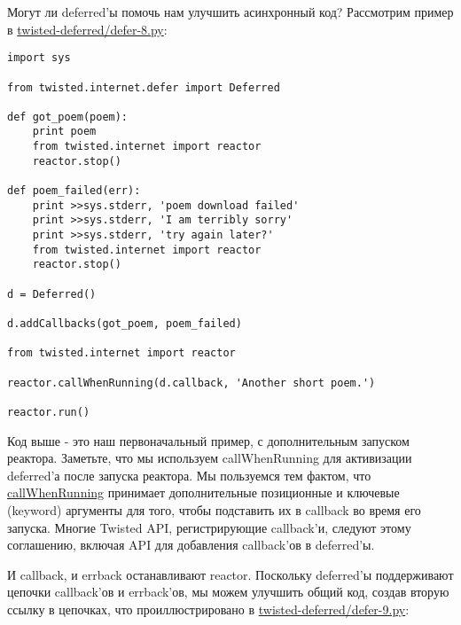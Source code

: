 Могут ли deferred'ы помочь нам улучшить асинхронный код? 
Рассмотрим пример в 
\href{http://github.com/jdavisp3/twisted-intro/blob/master/twisted-deferred/defer-8.py}{twisted-deferred/defer-8.py}:

 \begin{verbatim}
import sys

from twisted.internet.defer import Deferred

def got_poem(poem):
    print poem
    from twisted.internet import reactor
    reactor.stop()

def poem_failed(err):
    print >>sys.stderr, 'poem download failed'
    print >>sys.stderr, 'I am terribly sorry'
    print >>sys.stderr, 'try again later?'
    from twisted.internet import reactor
    reactor.stop()

d = Deferred()

d.addCallbacks(got_poem, poem_failed)

from twisted.internet import reactor

reactor.callWhenRunning(d.callback, 'Another short poem.')

reactor.run()
\end{verbatim} 

Код выше - это наш первоначальный пример, с 
дополнительным запуском реактора. Заметьте, 
что мы используем callWhenRunning для активизации deferred'а 
после запуска реактора. Мы пользуемся тем фактом, что 
\href{http://twistedmatrix.com/trac/browser/tags/releases/twisted-8.2.0/twisted/internet/interfaces.py#L766}{callWhenRunning} 
принимает дополнительные позиционные и ключевые (keyword) аргументы 
для того, чтобы подставить их в callback во время его запуска. 
Многие Twisted API, регистрирующие callback'и, следуют 
этому соглашению, включая API для добавления callback'ов в deferred'ы.


И callback, и errback останавливают reactor. 
Поскольку deferred'ы поддерживают цепочки 
callback'ов и errback'ов, мы можем улучшить общий код, 
создав вторую ссылку в цепочках, что проиллюстрировано в 
\href{http://github.com/jdavisp3/twisted-intro/blob/master/twisted-deferred/defer-9.py}{twisted-deferred/defer-9.py}:

